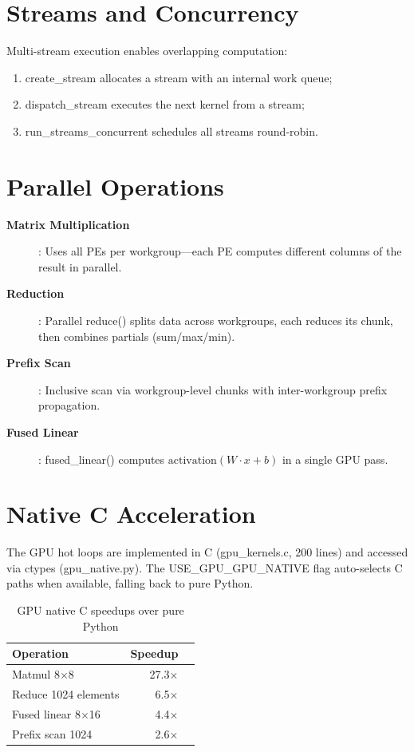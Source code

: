 \documentclass[12pt,a4paper,twoside]{book}
\theoremstyle{trinarytheorem}
\theoremstyle{trinarydefinition}
\newcommand{\code}[1]{\textsf{#1}}
\begin{document}
\section{Streams and Concurrency}

Multi-stream execution enables overlapping computation:
\begin{enumerate}
    \item \code{create\_stream} allocates a stream with an internal work queue;
    \item \code{dispatch\_stream} executes the next kernel from a stream;
    \item \code{run\_streams\_concurrent} schedules all streams round-robin.
\end{enumerate}

\section{Parallel Operations}

\begin{description}
    \item[\textbf{Matrix Multiplication}]: Uses all PEs per workgroup---each PE
          computes different columns of the result in parallel.
    \item[\textbf{Reduction}]: Parallel \code{reduce()} splits data across workgroups,
          each reduces its chunk, then combines partials (sum/max/min).
    \item[\textbf{Prefix Scan}]: Inclusive scan via workgroup-level chunks with
          inter-workgroup prefix propagation.
    \item[\textbf{Fused Linear}]: \code{fused\_linear()} computes
          $\text{activation}(W \cdot x + b)$ in a single GPU pass.
\end{description}

\section{Native C Acceleration}

The GPU hot loops are implemented in C (\code{gpu\_kernels.c}, 200 lines) and accessed
via ctypes (\code{gpu\_native.py}). The \code{USE\_GPU\_GPU\_NATIVE} flag auto-selects
C paths when available, falling back to pure Python.

\begin{table}[H]
\centering
\caption{GPU native C speedups over pure Python}
\label{tab:gpuspeedup}
\begin{tabular}{lrr}
\toprule
Operation & Speedup \\
\midrule
Matmul 8$\times$8 & 27.3$\times$ \\
Reduce 1024 elements & 6.5$\times$ \\
Fused linear 8$\times$16 & 4.4$\times$ \\
Prefix scan 1024 & 2.6$\times$ \\
\bottomrule
\end{tabular}
\end{table}
\end{document}
